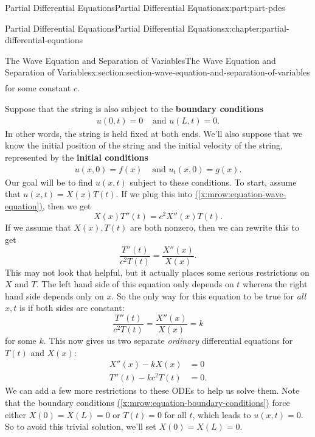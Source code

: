 \documentclass[twoside,10pt,]{book}
\newcommand{\xreffont}{\relax}
\newcommand{\terminology}[1]{\textbf{#1}}
\numberwithin{equation}{part}
\newcommand{\amp}{&}
\begin{document}
\begin{partptx}{Partial Differential Equations}{}{Partial Differential Equations}{}{}{x:part:part-pdes}
\begin{chapterptx}{Partial Differential Equations}{}{Partial Differential Equations}{}{}{x:chapter:partial-differential-equations}
\begin{sectionptx}{The Wave Equation and Separation of Variables}{}{The Wave Equation and Separation of Variables}{}{}{x:section:section-wave-equation-and-separation-of-variables}
\begin{align}
\end{align}
for some constant \(c\).%
\par
Suppose that the string is also subject to the \terminology{boundary conditions}%
%
\begin{align}
u(0,t) = 0 \amp\text{ and } u(L,t) = 0\text{.}\label{x:mrow:equation-boundary-conditions}
\end{align}
In other words, the string is held fixed at both ends. We'll also suppose that we know the initial position of the string and the initial velocity of the string, represented by the \terminology{initial conditions}%
%
\begin{align}
u(x,0) = f(x) \amp \text{ and } u_{t}(x,0) = g(x) \text{.}\label{x:mrow:equation-initial-condition}
\end{align}
Our goal will be to find \(u(x,t)\) subject to these conditions. To start, assume that \(u(x,t) = X(x)T(t).\) If we plug this into \hyperref[x:mrow:equation-wave-equation]{({\xreffont\ref{x:mrow:equation-wave-equation}})}, then we get%
%
\begin{equation*}
X(x)T''(t) = c^{2}X''(x)T(t).
\end{equation*}
If we assume that \(X(x),T(t)\) are both nonzero, then we can rewrite this to get%
\begin{equation*}
\frac{T''(t)}{c^{2}T(t)} = \frac{X''(x)}{X(x)}.
\end{equation*}
This may not look that helpful, but it actually places some serious restrictions on \(X\) and \(T\). The left hand side of this equation only depends on \(t\) whereas the right hand side depends only on \(x\). So the only way for this equation to be true for \emph{all} \(x,t\) is if both sides are constant:%
\begin{equation*}
\frac{T''(t)}{c^{2}T(t)} = \frac{X''(x)}{X(x)} = k
\end{equation*}
for some \(k\). This now gives us two separate \emph{ordinary} differential equations for \(T(t)\) and \(X(x)\):%
%
\begin{align}
X''(x) - kX(x) \amp = 0 \label{x:mrow:equation-separation-of-variables-1}\\
T''(t) - kc^{2}T(t) \amp = 0\text{.}\label{x:mrow:equation-separation-of-variables-2}
\end{align}
We can add a few more restrictions to these ODEs to help us solve them. Note that the boundary conditions \hyperref[x:mrow:equation-boundary-conditions]{({\xreffont\ref{x:mrow:equation-boundary-conditions}})} force either \(X(0) = X(L) = 0\) or \(T(t) = 0\) for all \(t\), which leads to \(u(x,t) = 0\). So to avoid this trivial solution, we'll set \(X(0) = X(L) = 0\).%

\end{sectionptx}
\end{chapterptx}
\end{partptx}
\end{document}
